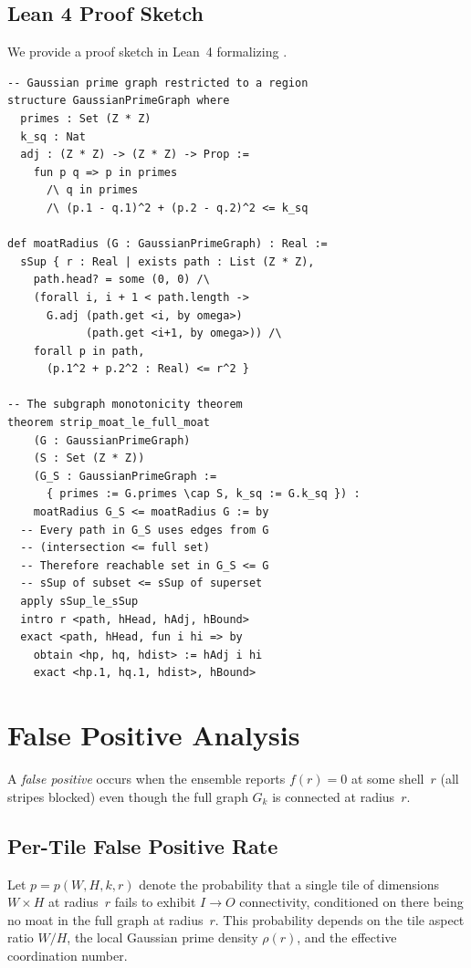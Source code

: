 \documentclass[11pt,a4paper]{article}
\theoremstyle{definition}
\theoremstyle{remark}
\newcommand{\IO}{I{\to}O}
\begin{document}
\subsection{Lean 4 Proof Sketch}

We provide a proof sketch in Lean~4 formalizing .

\begin{lstlisting}[style=lean4, caption={Subgraph monotonicity sketch in Lean 4 pseudocode (not machine-verified).}]
-- Gaussian prime graph restricted to a region
structure GaussianPrimeGraph where
  primes : Set (Z * Z)
  k_sq : Nat
  adj : (Z * Z) -> (Z * Z) -> Prop :=
    fun p q => p in primes
      /\ q in primes
      /\ (p.1 - q.1)^2 + (p.2 - q.2)^2 <= k_sq

def moatRadius (G : GaussianPrimeGraph) : Real :=
  sSup { r : Real | exists path : List (Z * Z),
    path.head? = some (0, 0) /\
    (forall i, i + 1 < path.length ->
      G.adj (path.get <i, by omega>)
            (path.get <i+1, by omega>)) /\
    forall p in path,
      (p.1^2 + p.2^2 : Real) <= r^2 }

-- The subgraph monotonicity theorem
theorem strip_moat_le_full_moat
    (G : GaussianPrimeGraph)
    (S : Set (Z * Z))
    (G_S : GaussianPrimeGraph :=
      { primes := G.primes \cap S, k_sq := G.k_sq }) :
    moatRadius G_S <= moatRadius G := by
  -- Every path in G_S uses edges from G
  -- (intersection <= full set)
  -- Therefore reachable set in G_S <= G
  -- sSup of subset <= sSup of superset
  apply sSup_le_sSup
  intro r <path, hHead, hAdj, hBound>
  exact <path, hHead, fun i hi => by
    obtain <hp, hq, hdist> := hAdj i hi
    exact <hp.1, hq.1, hdist>, hBound>
\end{lstlisting}

\section{False Positive Analysis}\label{sec:fp}

A \emph{false positive} occurs when the ensemble reports $f(r) = 0$
at some shell~$r$ (all stripes blocked) even though the full graph
$G_k$ is connected at radius~$r$.

\subsection{Per-Tile False Positive Rate}

Let $p = p(W, H, k, r)$ denote the probability that a single tile of
dimensions $W \times H$ at radius~$r$ fails to exhibit $\IO$
connectivity, conditioned on there being no moat in the full graph at
radius~$r$.  This probability depends on the tile aspect ratio $W/H$,
the local Gaussian prime density $\rho(r)$, and the effective
coordination number.
\end{document}
